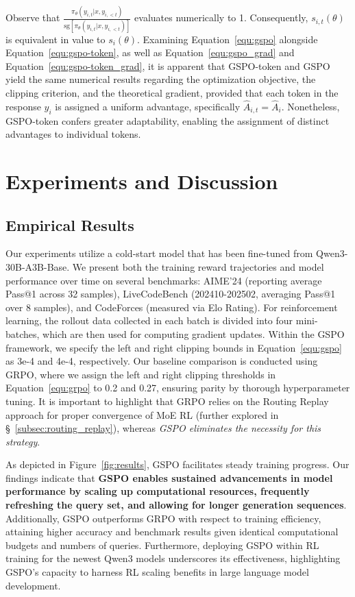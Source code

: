 Observe that $\frac{ \pi_{\theta} (y_{i,t} | x, y_{i,<t}) }{ \mathrm{sg} \left[ \pi_{\theta} (y_{i,t} | x, y_{i,<t}) \right] }$ evaluates numerically to 1. Consequently, $s_{i,t}(\theta)$ is equivalent in value to $s_{i}(\theta)$. Examining Equation~\eqref{equ:gspo} alongside Equation~\eqref{equ:gspo-token}, as well as Equation~\eqref{equ:gspo_grad} and Equation~\eqref{equ:gspo-token_grad}, it is apparent that GSPO-token and GSPO yield the same numerical results regarding the optimization objective, the clipping criterion, and the theoretical gradient, provided that each token in the response $y_i$ is assigned a uniform advantage, specifically $\widehat{A}_{i,t} = \widehat{A}_{i}$. Nonetheless, GSPO-token confers greater adaptability, enabling the assignment of distinct advantages to individual tokens.

\section{Experiments and Discussion}

\subsection{Empirical Results}

Our experiments utilize a cold-start model that has been fine-tuned from Qwen3-30B-A3B-Base. We present both the training reward trajectories and model performance over time on several benchmarks: AIME'24 (reporting average Pass@1 across 32 samples), LiveCodeBench (202410-202502, averaging Pass@1 over 8 samples), and CodeForces (measured via Elo Rating). For reinforcement learning, the rollout data collected in each batch is divided into four mini-batches, which are then used for computing gradient updates. Within the GSPO framework, we specify the left and right clipping bounds in Equation~\eqref{equ:gspo} as 3e-4 and 4e-4, respectively. Our baseline comparison is conducted using GRPO, where we assign the left and right clipping thresholds in Equation~\eqref{equ:grpo} to 0.2 and 0.27, ensuring parity by thorough hyperparameter tuning. It is important to highlight that GRPO relies on the Routing Replay approach for proper convergence of MoE RL (further explored in \S~\ref{subsec:routing_replay}), whereas \textit{GSPO eliminates the necessity for this strategy}.

As depicted in Figure~\ref{fig:results}, GSPO facilitates steady training progress. Our findings indicate that \textbf{GSPO enables sustained advancements in model performance by scaling up computational resources, frequently refreshing the query set, and allowing for longer generation sequences}. Additionally, GSPO outperforms GRPO with respect to training efficiency, attaining higher accuracy and benchmark results given identical computational budgets and numbers of queries. Furthermore, deploying GSPO within RL training for the newest Qwen3 models underscores its effectiveness, highlighting GSPO’s capacity to harness RL scaling benefits in large language model development.

